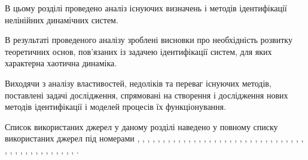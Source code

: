В цьому розділі проведено аналіз існуючих визначень і методів
ідентифікації нелінійних динамічних систем.

В результаті проведеного аналізу зроблені висновки про
необхідність розвитку теоретичних основ, пов'язаних із
задачею ідентифікації систем, для яких характерна хаотична
динаміка.

Виходячи з аналізу властивостей, недоліків та переваг існуючих методів,
поставлені задачі дослідження, спрямовані на створення і
дослідження нових методів ідентифікації і моделей процесів
їх функціонування.

Список використаних джерел у даному розділі наведено у повному
списку використаних джерел під номерами
\cite{adopt_cont_sys},
\cite{andronov_vitt_haikin},
\cite{atu_phd_thesis},
\cite{auto_optim_intask},
\cite{bodyan_adapt_viyavl},
\cite{borcov},
\cite{chen_nls_id_radial_basis},
\cite{chen_nn_for_nls_mod},
\cite{chernavskii_syn_info},
\cite{deith_method_id_ds},
\cite{dmitriev_trans_chaos_lowpower},
\cite{eykhoff_id_base},
\cite{eykhoff_modern_id},
\cite{gladkov_optim_nongrad},
\cite{gropp_methods_id},
\cite{ivah_int_meth_direct},
\cite{ivanov_stoh_alg_int},
\cite{karabutov_adapt_id_sys},
\cite{koltsova_nl_dyn_chem},
\cite{kozlov_nosearch_sns},
\cite{kras_dyn_nsn},
\cite{kubik_nlsc},
\cite{kuznetsov_dyn_chaos},
\cite{leondes_modern_tu},
\cite{lung_id_sys},
\cite{magni_theory_dyn_chaos},
\cite{mai_adopt_meth_direct},
\cite{mai_iss_adop_alg_etalon},
\cite{mai_sear_meth_akt_id_ns},
\cite{mai_syntez_adop_id},
\cite{medved_nepar_alg_id_nds},
\cite{mich_92},
\cite{mich_upr_prost_mech},
\cite{moon_chaotic_vibr},
\cite{narendra_id_ctl_ds_nn},
\cite{nelles_nlsys_id},
\cite{patra_nds_id_cheb},
\cite{prigogine_from_existent},
\cite{raibman_id_obj_ctl},
\cite{rastr_adop_complex_sys},
\cite{rastr_intro},
\cite{rastr_rand_search},
\cite{rastr_rand_search_adopt},
\cite{rastr_seu},
\cite{rastr_stat_meth_search},
\cite{saliga_id_ctl_black},
\cite{vukobr_nonadopt},
\cite{zadeh_id_1956}.




